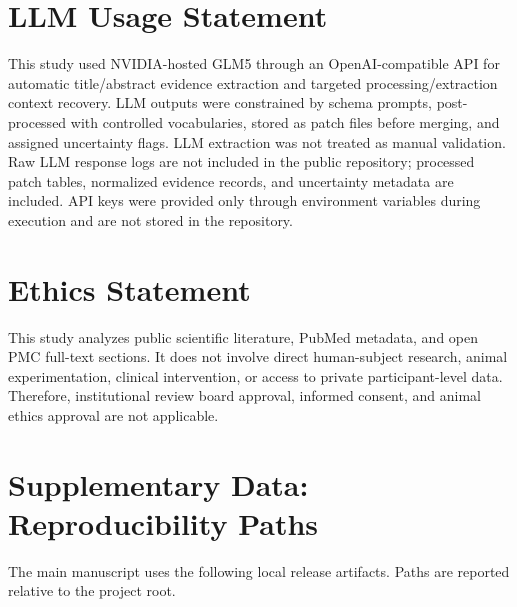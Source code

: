 \documentclass[11pt]{article}
\begin{document}
\section*{LLM Usage Statement}

This study used NVIDIA-hosted GLM5 through an OpenAI-compatible API for automatic title/abstract evidence extraction and targeted processing/extraction context recovery. LLM outputs were constrained by schema prompts, post-processed with controlled vocabularies, stored as patch files before merging, and assigned uncertainty flags. LLM extraction was not treated as manual validation. Raw LLM response logs are not included in the public repository; processed patch tables, normalized evidence records, and uncertainty metadata are included. API keys were provided only through environment variables during execution and are not stored in the repository.

\section*{Ethics Statement}

This study analyzes public scientific literature, PubMed metadata, and open PMC full-text sections. It does not involve direct human-subject research, animal experimentation, clinical intervention, or access to private participant-level data. Therefore, institutional review board approval, informed consent, and animal ethics approval are not applicable.

\appendix

\section{Supplementary Data: Reproducibility Paths}
\label{app:reproducibility}

The main manuscript uses the following local release artifacts. Paths are reported relative to the project root.
\end{document}
